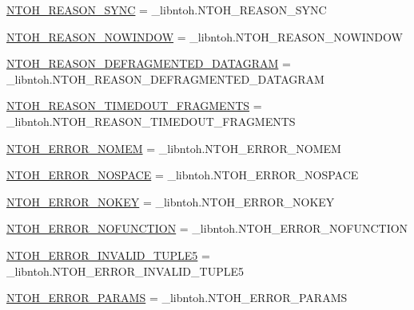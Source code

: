 \begin{DoxyCompactItemize}
\item 
\hyperlink{namespacelibntoh_a4d12b2e07f641dee167e47d268c20b3f}{N\-T\-O\-H\-\_\-\-R\-E\-A\-S\-O\-N\-\_\-\-S\-Y\-N\-C} = \-\_\-libntoh.\-N\-T\-O\-H\-\_\-\-R\-E\-A\-S\-O\-N\-\_\-\-S\-Y\-N\-C
\item 
\hyperlink{namespacelibntoh_a78ca23e28d9281e8a328a41f6157c0b5}{N\-T\-O\-H\-\_\-\-R\-E\-A\-S\-O\-N\-\_\-\-N\-O\-W\-I\-N\-D\-O\-W} = \-\_\-libntoh.\-N\-T\-O\-H\-\_\-\-R\-E\-A\-S\-O\-N\-\_\-\-N\-O\-W\-I\-N\-D\-O\-W
\item 
\hyperlink{namespacelibntoh_a8dc5c68f06712ac6ab31af42e0a2aa4e}{N\-T\-O\-H\-\_\-\-R\-E\-A\-S\-O\-N\-\_\-\-D\-E\-F\-R\-A\-G\-M\-E\-N\-T\-E\-D\-\_\-\-D\-A\-T\-A\-G\-R\-A\-M} = \-\_\-libntoh.\-N\-T\-O\-H\-\_\-\-R\-E\-A\-S\-O\-N\-\_\-\-D\-E\-F\-R\-A\-G\-M\-E\-N\-T\-E\-D\-\_\-\-D\-A\-T\-A\-G\-R\-A\-M
\item 
\hyperlink{namespacelibntoh_a9a5f33eff9f03cf77ec7288c8d4e7e0f}{N\-T\-O\-H\-\_\-\-R\-E\-A\-S\-O\-N\-\_\-\-T\-I\-M\-E\-D\-O\-U\-T\-\_\-\-F\-R\-A\-G\-M\-E\-N\-T\-S} = \-\_\-libntoh.\-N\-T\-O\-H\-\_\-\-R\-E\-A\-S\-O\-N\-\_\-\-T\-I\-M\-E\-D\-O\-U\-T\-\_\-\-F\-R\-A\-G\-M\-E\-N\-T\-S
\item 
\hyperlink{namespacelibntoh_aafd8266dadc0bafcd2a6690bcfead855}{N\-T\-O\-H\-\_\-\-E\-R\-R\-O\-R\-\_\-\-N\-O\-M\-E\-M} = \-\_\-libntoh.\-N\-T\-O\-H\-\_\-\-E\-R\-R\-O\-R\-\_\-\-N\-O\-M\-E\-M
\item 
\hyperlink{namespacelibntoh_a6fb66195b88f26e139b42d5bcf03b705}{N\-T\-O\-H\-\_\-\-E\-R\-R\-O\-R\-\_\-\-N\-O\-S\-P\-A\-C\-E} = \-\_\-libntoh.\-N\-T\-O\-H\-\_\-\-E\-R\-R\-O\-R\-\_\-\-N\-O\-S\-P\-A\-C\-E
\item 
\hyperlink{namespacelibntoh_a374030a996a1ea2eb1ea6bef7c20ce93}{N\-T\-O\-H\-\_\-\-E\-R\-R\-O\-R\-\_\-\-N\-O\-K\-E\-Y} = \-\_\-libntoh.\-N\-T\-O\-H\-\_\-\-E\-R\-R\-O\-R\-\_\-\-N\-O\-K\-E\-Y
\item 
\hyperlink{namespacelibntoh_aeceea101ed9532e7e725d4b2a711905b}{N\-T\-O\-H\-\_\-\-E\-R\-R\-O\-R\-\_\-\-N\-O\-F\-U\-N\-C\-T\-I\-O\-N} = \-\_\-libntoh.\-N\-T\-O\-H\-\_\-\-E\-R\-R\-O\-R\-\_\-\-N\-O\-F\-U\-N\-C\-T\-I\-O\-N
\item 
\hyperlink{namespacelibntoh_a27dd9478da8f3b065871ad7cc435ac52}{N\-T\-O\-H\-\_\-\-E\-R\-R\-O\-R\-\_\-\-I\-N\-V\-A\-L\-I\-D\-\_\-\-T\-U\-P\-L\-E5} = \-\_\-libntoh.\-N\-T\-O\-H\-\_\-\-E\-R\-R\-O\-R\-\_\-\-I\-N\-V\-A\-L\-I\-D\-\_\-\-T\-U\-P\-L\-E5
\item 
\hyperlink{namespacelibntoh_a28617b89da63990d5d57b6352f4dc8ab}{N\-T\-O\-H\-\_\-\-E\-R\-R\-O\-R\-\_\-\-P\-A\-R\-A\-M\-S} = \-\_\-libntoh.\-N\-T\-O\-H\-\_\-\-E\-R\-R\-O\-R\-\_\-\-P\-A\-R\-A\-M\-S

\end{DoxyCompactItemize}
